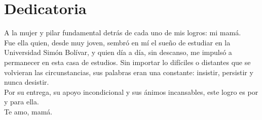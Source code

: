 \chapter*{Dedicatoria}

A la mujer y pilar fundamental detrás de cada uno de mis logros: mi mamá. \\

Fue ella quien, desde muy joven, sembró en mí el sueño de estudiar en la Universidad Simón Bolívar, y quien día a día, sin descanso, me impulsó a permanecer en esta casa de estudios. Sin importar lo difíciles o distantes que se volvieran las circunstancias, sus palabras eran una constante: insistir, persistir y nunca desistir. \\

Por su entrega, su apoyo incondicional y sus ánimos incansables, este logro es por y para ella. \\

Te amo, mamá.
